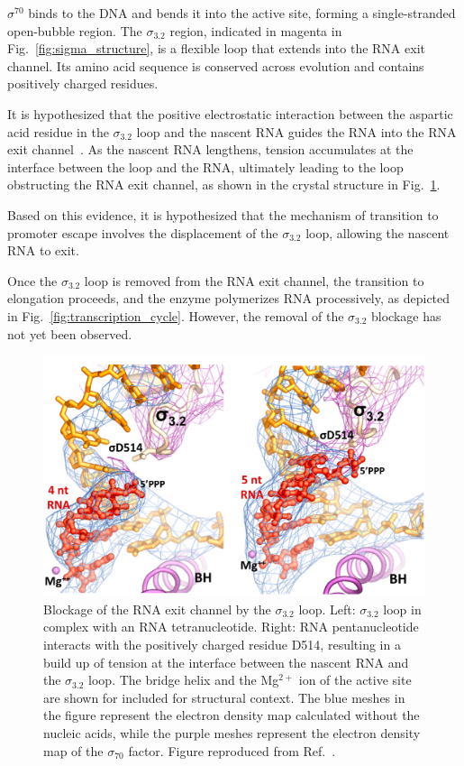 $\sigma^{70}$ binds to the DNA and bends it into the active site, forming a single-stranded open-bubble region.
The $\sigma_{3.2}$ region, indicated in magenta in Fig.~\ref{fig:sigma_structure}, is a flexible loop that extends into the RNA exit channel. 
Its amino acid sequence is conserved across evolution and contains positively charged residues.

It is hypothesized that the positive electrostatic interaction between the aspartic acid residue in the $\sigma_{3.2}$ loop and the nascent RNA guides the RNA into the RNA exit channel~\cite{zuo_steitz_2015}. 
As the nascent RNA lengthens, tension accumulates at the interface between the loop and the RNA, ultimately leading to the loop obstructing the RNA exit channel, as shown in the crystal structure in Fig.~\ref{fig:sigma_blockage}.

Based on this evidence, it is hypothesized that the mechanism of transition to promoter escape involves the displacement of the $\sigma_{3.2}$ loop, allowing the nascent RNA to exit.

Once the $\sigma_{3.2}$ loop is removed from the RNA exit channel, the transition to elongation proceeds, and the enzyme polymerizes RNA processively, as depicted in Fig.~\ref{fig:transcription_cycle}. 
However, the removal of the $\sigma_{3.2}$ blockage has not yet been observed. 

\begin{figure}
    \centering
    \includegraphics[width=\textwidth]{chapters/figures/sigma_blockage.jpg}
    \caption{\label{fig:sigma_blockage} 
    Blockage of the RNA exit channel by the $\sigma_{3.2}$ loop.
    Left: $\sigma_{3.2}$ loop in complex with an RNA tetranucleotide.
    Right: RNA pentanucleotide interacts with the positively charged residue D514, resulting in a build up of tension at the interface between the nascent RNA and the $\sigma_{3.2}$ loop.
    The bridge helix and the Mg$^{2+}$ ion of the active site are shown for included for structural context.
    The blue meshes in the figure represent the electron density map calculated without the nucleic acids, while the purple meshes represent the electron density map of the $\sigma_{70}$ factor.
    Figure reproduced from Ref.~\cite{zuo_steitz_2015}.
    }
\end{figure}

